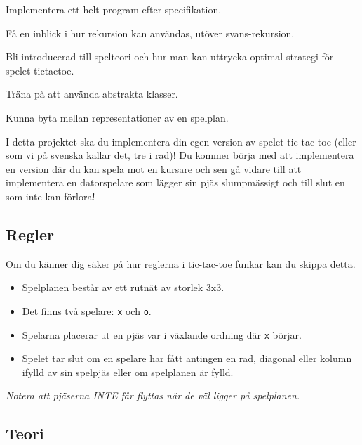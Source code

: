

\begin{Goals}
	\item Implementera ett helt program efter specifikation.
	\item Få en inblick i hur rekursion kan användas, utöver svans-rekursion.
	\item Bli introducerad till spelteori och hur man kan uttrycka optimal strategi för spelet tictactoe.
	\item Träna på att använda abstrakta klasser.
	\item Kunna byta mellan representationer av en spelplan.
\end{Goals}

I detta projektet ska du implementera din egen version av spelet tic-tac-toe (eller som vi på svenska kallar det, tre i rad)! Du kommer börja med att implementera en version där du kan spela mot en kursare och sen gå vidare till att implementera en datorspelare som lägger sin pjäs slumpmässigt och till slut en som inte kan förlora!


\subsection{Regler}
Om du känner dig säker på hur reglerna i tic-tac-toe funkar kan du skippa detta. 
\begin{itemize}
	\item Spelplanen består av ett rutnät av storlek 3x3.
	\item Det finns två spelare: \texttt{x} och \texttt{o}.
	\item Spelarna placerar ut en pjäs var i växlande ordning där \texttt{x} börjar.
	\item Spelet tar slut om en spelare har fått antingen en rad, diagonal eller kolumn ifylld av sin spelpjäs eller om spelplanen är fylld.
\end{itemize}
\textit{Notera att pjäserna INTE får flyttas när de väl ligger på spelplanen.}

\subsection{Teori}

